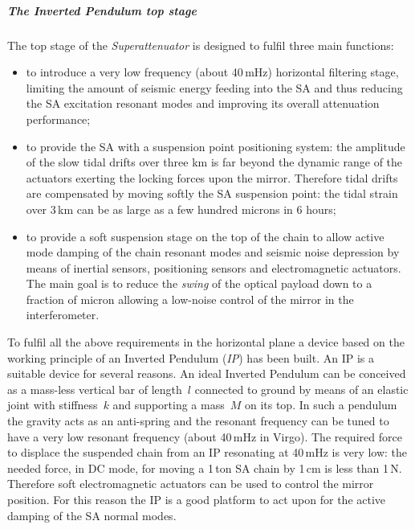 \subparagraph{The Inverted Pendulum top stage}
The top stage of the \emph{Superattenuator} is designed to fulfil three main functions:
\begin{itemize}
\item to introduce a very low frequency (about 40\,mHz) horizontal filtering stage, limiting the amount of seismic energy feeding into the SA and thus reducing the SA excitation resonant modes and improving its overall attenuation performance;
\item to provide the SA with a suspension point positioning system: the amplitude of the slow tidal drifts over three km is far beyond the dynamic range of the actuators exerting the locking forces upon the mirror. Therefore tidal drifts are compensated by moving softly the SA suspension point: the tidal strain over 3\,km can be as large as a few hundred microns in 6 hours;
\item to provide a soft suspension stage on the top of the chain to allow active mode damping of the chain resonant modes and seismic noise depression by means of inertial sensors, positioning sensors and electromagnetic actuators. The main goal is to reduce the \emph{swing} of the optical payload down to a fraction of micron allowing a low-noise control of the mirror in the interferometer.
\end{itemize}
To fulfil all the above requirements in the horizontal plane a device based on the working principle of an Inverted Pendulum (\emph{IP}) has been built. An IP is a suitable device for several reasons. An ideal Inverted Pendulum can be conceived as a mass-less vertical bar of length~$l$ connected to ground by means of an elastic joint with stiffness~$k$ and supporting a mass~$M$ on its top. In such a pendulum the gravity acts as an anti-spring and the resonant frequency can be tuned to have a very low resonant frequency (about 40\,mHz in Virgo). The required force to displace the suspended chain from an IP resonating at 40\,mHz is very low: the needed force, in DC mode, for moving a 1\,ton SA chain by 1\,cm is less than 1\,N. Therefore soft electromagnetic actuators can be used to control the mirror position. For this reason the IP is a good platform to act upon for the active damping of the SA normal modes.


